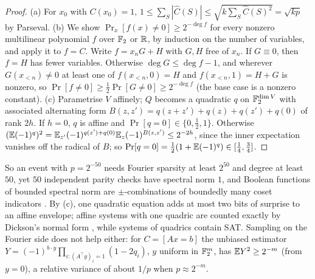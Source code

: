 \begin{proof}
(a) For $x_0$ with $C(x_0)=1$, $1\le\sum_S|\hat C(S)|\le\sqrt{k\sum_S\hat C(S)^2}=
\sqrt{kp}$ by Parseval. (b) We show $\Pr_x[f(x)\ne0]\ge2^{-\deg f}$ for every nonzero multilinear
polynomial $f$ over $\mathbb{F}_2$ or $\mathbb{R}$, by induction on the number of variables, and apply
it to $f=C$. Write $f=x_nG+H$ with $G,H$ free of $x_n$. If $G\equiv0$, then $f=H$ has
fewer variables. Otherwise $\deg G\le\deg f-1$, and wherever $G(x_{<n})\ne0$ at least
one of $f(x_{<n},0)=H$ and $f(x_{<n},1)=H+G$ is nonzero, so $\Pr[f\ne0]\ge\frac12\Pr[G\ne0]\ge
2^{-\deg f}$ (the base case is a nonzero constant). (c) Parametrise $V$ affinely;
$Q$ becomes a quadratic $q$ on $\mathbb{F}_2^{\dim V}$ with associated alternating form
$B(z,z')=q(z+z')+q(z)+q(z')+q(0)$ of rank $2h$. If $h=0$, $q$ is affine and
$\Pr[q=0]\in\{0,\frac12,1\}$. Otherwise
$(\mathbb{E}(-1)^{q})^2=\mathbb{E}_{z'}(-1)^{q(z')+q(0)}\mathbb{E}_z(-1)^{B(z,z')}\le2^{-2h}$, since the inner
expectation vanishes off the radical of $B$; so $\Pr[q=0]=\frac12(1+\mathbb{E}(-1)^q)\in[\frac14,\frac34]$.
\end{proof}

So an event with $p=2^{-50}$ needs Fourier sparsity at least $2^{50}$ and degree at
least $50$, yet $50$ independent parity checks have spectral norm $1$, and Boolean
functions of bounded spectral norm are $\pm$-combinations of boundedly many coset
indicators \cite{greensanders2008}. By (c), one quadratic equation adds at most two
bits of surprise to an affine envelope; affine systems with one quadric are counted
exactly by Dickson's normal form \cite{ek1990}, while systems of quadrics contain SAT.
Sampling on the Fourier side does not help either: for $C=[Ax=b]$ the unbiased
estimator $Y=(-1)^{b\cdot y}\prod_{i:(A^\top y)_i=1}(1-2q_i)$, $y$ uniform in $\mathbb{F}_2^m$,
has $\mathbb{E} Y^2\ge2^{-m}$ (from $y=0$), a relative variance of about $1/p$ when
$p\approx2^{-m}$.

